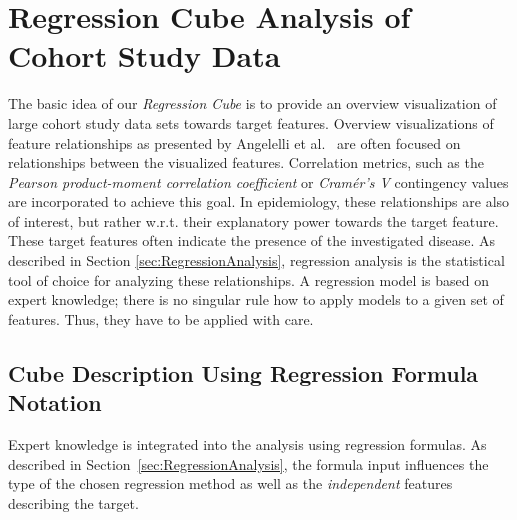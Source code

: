 \documentclass[journal]{style/vgtc} 			          %
\begin{document}
\section{Regression Cube Analysis of Cohort Study Data}
The basic idea of our \emph{Regression Cube} is to provide an overview visualization of large cohort study data sets towards target features.
Overview visualizations of feature relationships as presented by Angelelli et al.~\cite{Angelelli} are often focused on relationships between the visualized features.
Correlation metrics, such as the \emph{Pearson product-moment correlation coefficient} or \emph{Cram\'{e}r's V} contingency values are incorporated to achieve this goal.
In epidemiology, these relationships are also of interest, but rather w.r.t. their explanatory power towards the target feature.
These target features often indicate the presence of the investigated disease.
As described in Section \ref{sec:RegressionAnalysis}, regression analysis is the statistical tool of choice for analyzing these relationships.
A regression model is based on expert knowledge; there is no singular rule how to apply models to a given set of features. Thus, they have to be applied with care.
\subsection{Cube Description Using Regression Formula Notation}
Expert knowledge is integrated into the analysis using regression formulas.
As described in Section~\ref{sec:RegressionAnalysis}, the formula input influences the type of the chosen regression method as well as the \emph{independent} features describing the target.
\end{document}
